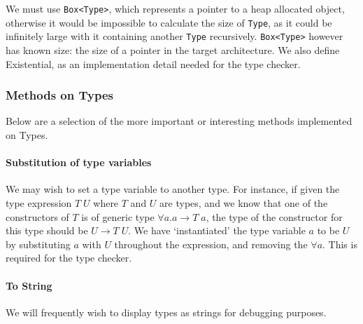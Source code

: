 We must use \verb|Box<Type>|, which represents a pointer to a heap allocated object, otherwise it would be impossible to calculate the size of \verb|Type|, as it could be infinitely large with it containing another \verb|Type| recursively. \verb|Box<Type>| however has known size: the size of a pointer in the target architecture. We also define Existential, as an implementation detail needed for the type checker. 

\subsubsection{Methods on Types}
Below are a selection of the more important or interesting methods implemented on Types.

\paragraph{Substitution of type variables} We may wish to set a type variable to another type. For instance, if given the type expression \(T \; U\) where \(T\) and \(U\) are types, and we know that one of the constructors of \(T\) is of generic type \(\forall a.a \rightarrow T \; a\), the type of the constructor for this type should be \(U \rightarrow T \; U\). We have `instantiated' the type variable \(a\) to be \(U\) by substituting \(a\) with \(U\) throughout the expression, and removing the \(\forall a\). This is required for the type checker. 

\paragraph{To String} We will frequently wish to display types as strings for debugging purposes. 

